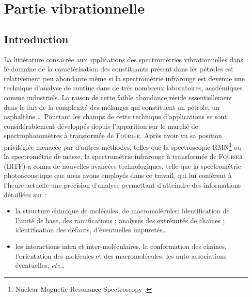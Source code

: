 \chapter{Partie vibrationnelle}
\minitoc
\restoregeometry

\newpage



\section*{Introduction}
La littérature consacrée aux applications des spectrométries vibrationnelles dans le domaine de la caractérisation des constituants présent dans les pétroles est relativement peu abondante même si la spectrométrie infrarouge est devenue une technique d'analyse de \og routine \fg{} dans de très nombreux laboratoires, académiques comme industriels. La raison de cette faible abondance réside essentiellement dans le fait de la complexité des mélanges qui constituent un pétrole, un asphaltène … Pourtant les champs de cette technique d'applications se sont considérablement développés depuis l'apparition sur le marché de spectrophotomètres à transformée de \textsc{Fourier}.
Après avoir vu sa position privilégiée menacée par d'autres méthodes, telles que la spectroscopie RMN\footnote{\og Nuclear Magnetic Resonance Spectroscopy \fg{}.} ou la spectrométrie de masse, la spectrométrie infrarouge à transformée de \textsc{Fourier} (IRTF) a connu de nouvelles avancées technologiques, telle que la spectrométrie photoacoustique que nous avons employés dans ce travail, qui lui confèrent à l'heure actuelle une précision d'analyse permettant d'atteindre des informations détaillées sur :

\begin{itemize}
	\item la structure chimique de molécules, de macromolécules: identification de l'unité de base, des ramifications ; analyses des extrémités de chaînes ; identification des défauts, d'éventuelles impuretés\dots{}
	\item les interactions intra et inter-moléculaires, la conformation des chaînes, l'orientation des molécules et des macromolécules, les auto-associations éventuelles, \textit{etc}\dots{}
\end{itemize}

